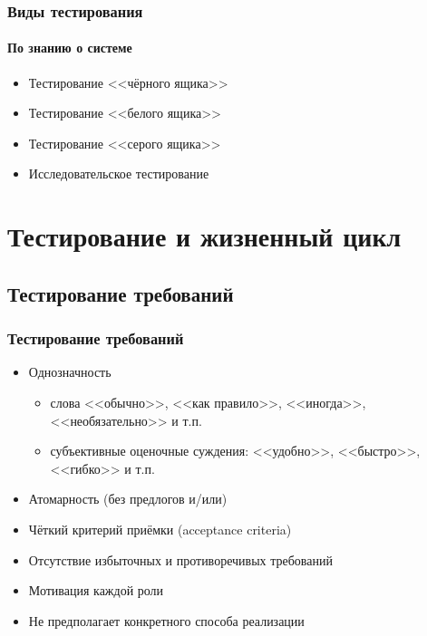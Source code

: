 \documentclass{../../slides-style}
\begin{document}
    \begin{frame}
        \frametitle{Виды тестирования}
        \framesubtitle{По знанию о системе}
        \begin{itemize}
            \item Тестирование <<чёрного ящика>>
            \item Тестирование <<белого ящика>>
            \item Тестирование <<серого ящика>>
            \item Исследовательское тестирование
        \end{itemize}
    \end{frame}

    \section{Тестирование и жизненный цикл}

    \subsection{Тестирование требований}

    \begin{frame}
        \frametitle{Тестирование требований}
        \begin{itemize}
            \item Однозначность
            \begin{itemize}
                \item слова <<обычно>>, <<как правило>>, <<иногда>>, <<необязательно>> и т.п.
                \item субъективные оценочные суждения: <<удобно>>, <<быстро>>, <<гибко>> и т.п.
            \end{itemize}
            \item Атомарность (без предлогов и/или)
            \item Чёткий критерий приёмки (acceptance criteria)
            \item Отсутствие избыточных и противоречивых требований
            \item Мотивация каждой роли
            \item Не предполагает конкретного способа реализации
        \end{itemize}
    \end{frame}
\end{document}
